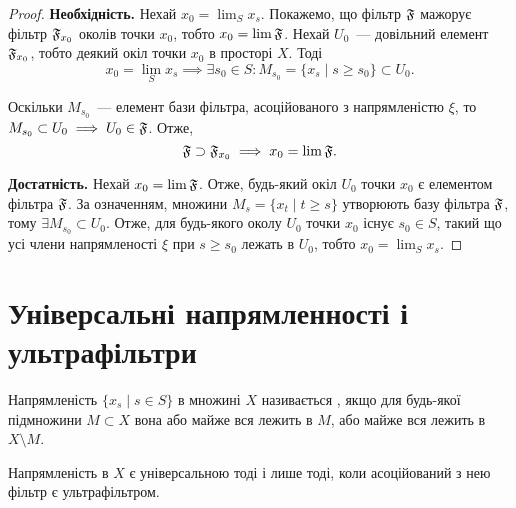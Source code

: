\begin{proof}
    \textbf{Необхідність.} Нехай $x_0 = \lim_S x_s$. Покажемо, що фільтр $\frak F$ мажорує фільтр $\frak F_{x_0}$ околів точки $x_0$, тобто $x_0 = \lim \frak F$. Нехай $U_0$~--- довільний елемент $\frak F_{x_0}$, тобто деякий окіл точки $x_0$ в просторі $X$. Тоді
    \begin{equation*}
        x_0 = \lim_S x_s \implies
        \exists s_0 \in S: M_{s_0} = \{ x_s \mid s \ge s_0 \} \subset U_0.
    \end{equation*}

    Оскільки $M_{s_0}$~--- елемент бази фільтра, асоційованого з напрямленістю $\xi$, то $M_{s_0} \subset U_0 \implies U_0 \in \frak F$. Отже, 
    \begin{equation*}
        \frak F \supset \frak F_{x_0} \implies x_0 = \lim \frak F.
    \end{equation*}

    \textbf{Достатність.} Нехай $x_0 = \lim \frak F$. Отже, будь-який окіл $U_0$ точки $x_0$ є елементом фільтра $\frak F$. За означенням, множини $M_s = \{x_t \mid t \ge s\}$ утворюють базу фільтра $\frak F$, тому $\exists M_{s_0} \subset U_0$. Отже, для будь-якого околу $U_0$ точки $x_0$ існує $s_0 \in S$, такий що усі члени напрямленості $\xi$ при $s \ge s_0$ лежать в $U_0$, тобто $x_0 = \lim_S x_s$.
\end{proof}

\section{Універсальні напрямленності і ультрафільтри}

\begin{definition}
    Напрямленість $\{x_s \mid s\in S\}$ в множині $X$ називається , якщо для будь-якої підмножини $M \subset X$ вона або майже вся лежить в $M$, або майже вся лежить в $X \setminus M$.
\end{definition}

\begin{theorem}
    \label{th:universal-net-is-ultrafilter}
    Напрямленість в $X$ є універсальною тоді і лише тоді, коли асоційований з нею фільтр є ультрафільтром.
\end{theorem}

